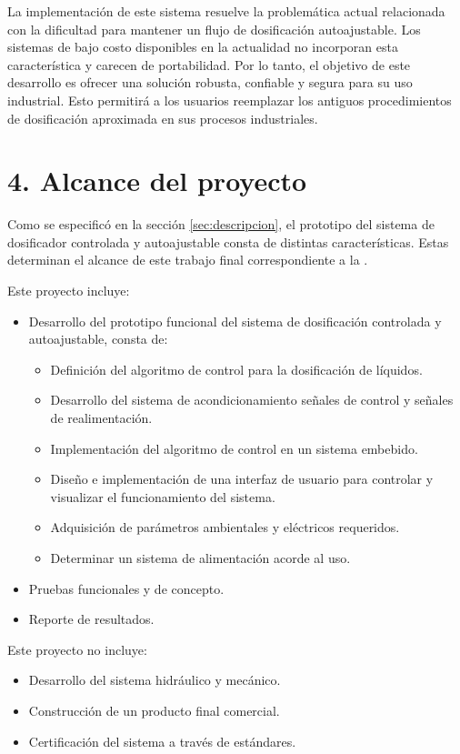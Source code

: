 \documentclass[
11pt, %
]{charter}
\begin{document}
La implementación de este sistema resuelve la problemática actual relacionada con la dificultad para mantener un flujo de dosificación autoajustable. Los sistemas de bajo costo disponibles en la actualidad no incorporan esta característica y carecen de portabilidad. Por lo tanto, el objetivo de este desarrollo es ofrecer una solución robusta, confiable y segura para su uso industrial. Esto permitirá a los usuarios reemplazar los antiguos procedimientos de dosificación aproximada en sus procesos industriales.

\section{4. Alcance del proyecto}
\label{sec:alcance}

Como se especificó en la sección \ref{sec:descripcion}, el prototipo del sistema de dosificador controlada y autoajustable consta de distintas características. Estas determinan el alcance de este trabajo final correspondiente a la  \degreename\hspace{1px}.

Este proyecto incluye:

\begin{itemize}
	\item Desarrollo del prototipo funcional del sistema de dosificación controlada y autoajustable, consta de:
			\begin{itemize}
	\item Definición del algoritmo de control para la dosificación de líquidos.
	\item Desarrollo del sistema de acondicionamiento señales de control y señales de realimentación.
	\item Implementación del algoritmo de control en un sistema embebido.
	\item Diseño e implementación de una interfaz de usuario para controlar y visualizar el funcionamiento del sistema.
	\item Adquisición de parámetros ambientales y eléctricos requeridos.
	\item Determinar un sistema de alimentación acorde al uso.
			\end{itemize}
	\item Pruebas funcionales y de concepto.
	\item Reporte de resultados.
\end{itemize}

Este proyecto no incluye:

\begin{itemize}
	\item Desarrollo del sistema hidráulico y mecánico.
	\item Construcción de un producto final comercial.
	\item Certificación del sistema a través de estándares.
\end{itemize}
\end{document}
